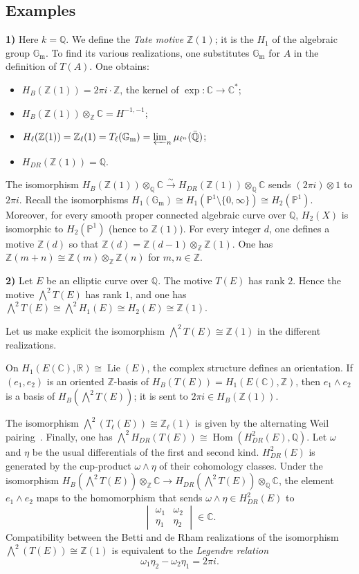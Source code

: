 \documentclass[11pt]{amsart}
\theoremstyle{definition}
\DeclareMathOperator{\Lie}{Lie}
\DeclareMathOperator{\Hom}{Hom}
\newcommand{\ZZ}{\mathbb{Z}}
\newcommand{\QQ}{\mathbb{Q}}
\newcommand{\CC}{\mathbb{C}}
\newcommand{\RR}{\mathbb{R}}
\newcommand{\PP}{\mathbb{P}}
\newcommand{\Gm}{\mathbb{G}_{\mathrm m}}
\begin{document}
\subsection*{Examples}

\noindent\textbf{1)} Here $k=\QQ$. We define the \emph{Tate motive} $\ZZ(1)$; it is the $H_1$ of the algebraic group $\Gm$. To find its various realizations, one substitutes $\Gm$ for $A$ in the definition of $T(A)$. One obtains:
\begin{itemize}[label=--]
\item $H_B(\ZZ(1)) = 2\pi i\cdot \ZZ$, the kernel of $\exp:\CC\to \CC^*$;
\item $H_B(\ZZ(1))\otimes_\ZZ \CC = H^{-1,-1}$;
\item $H_\ell(\ZZ(1)) = \ZZ_\ell(1)=T_\ell(\Gm)=\varprojlim_n \mu_{\ell^n}(\bar{\QQ})$;
\item $H_{DR}(\ZZ(1)) = \QQ$.
\end{itemize}

The isomorphism $H_B(\ZZ(1))\otimes_\QQ \CC \xrightarrow{\sim} H_{DR}(\ZZ(1))\otimes_\QQ \CC$ sends $(2\pi i)\otimes 1$ to $2\pi i$. Recall the isomorphisms $H_1(\Gm)\cong H_1(\PP^1\setminus\{0,\infty\})\cong H_2(\PP^1)$. Moreover, for every smooth proper connected algebraic curve over $\QQ$, $H_2(X)$ is isomorphic to $H_2(\PP^1)$ (hence to $\ZZ(1)$). For every integer $d$, one defines a motive $\ZZ(d)$ so that $\ZZ(d)=\ZZ(d-1)\otimes_\ZZ \ZZ(1)$. One has $\ZZ(m+n)\cong \ZZ(m)\otimes_\ZZ \ZZ(n)$ for $m,n\in \ZZ$.

\noindent\textbf{2)} Let $E$ be an elliptic curve over $\QQ$. The motive $T(E)$ has rank $2$. Hence the motive $\bigwedge^2 T(E)$ has rank $1$, and one has $\bigwedge^2 T(E)\cong \bigwedge^2 H_1(E)\cong H_2(E)\cong \ZZ(1)$.

Let us make explicit the isomorphism $\bigwedge^2 T(E)\cong \ZZ(1)$ in the different realizations.

On $H_1(E(\CC),\RR)\cong \Lie(E)$, the complex structure defines an orientation. If $(e_1,e_2)$ is an oriented $\ZZ$-basis of $H_B(T(E))=H_1(E(\CC),\ZZ)$, then $e_1\wedge e_2$ is a basis of $H_B(\bigwedge^2 T(E))$; it is sent to $2\pi i\in H_B(\ZZ(1))$.

The isomorphism $\bigwedge^2(T_\ell(E))\cong \ZZ_\ell(1)$ is given by the alternating Weil pairing~\cite{Weil1}. Finally, one has $\bigwedge^2 H_{DR}(T(E))\cong \Hom(H^2_{DR}(E),\QQ)$. Let $\omega$ and $\eta$ be the usual differentials of the first and second kind. $H^2_{DR}(E)$ is generated by the cup-product $\omega\wedge \eta$ of their cohomology classes. Under the isomorphism $H_B(\bigwedge^2 T(E))\otimes_\ZZ \CC \to H_{DR}(\bigwedge^2 T(E))\otimes_\QQ \CC$, the element $e_1\wedge e_2$ maps to the homomorphism that sends $\omega\wedge \eta\in H^2_{DR}(E)$ to
\[
\begin{vmatrix}
\omega_1 & \omega_2\\
\eta_1 & \eta_2
\end{vmatrix}\in\CC.
\]
Compatibility between the Betti and de Rham realizations of the isomorphism $\bigwedge^2(T(E))\cong \ZZ(1)$ is equivalent to the \emph{Legendre relation}
\[
\omega_1\eta_2-\omega_2\eta_1 = 2\pi i.
\]
\end{document}
